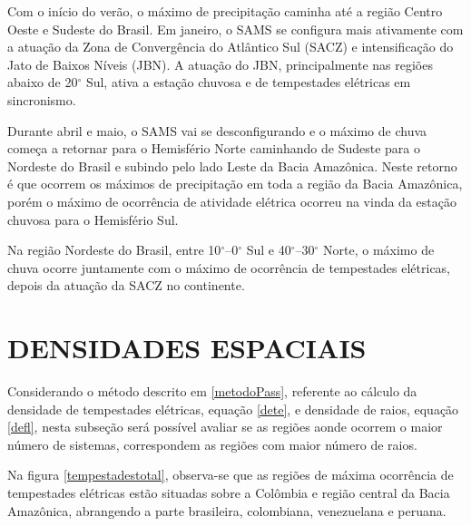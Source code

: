 Com o início do verão, o máximo de precipitação caminha até a região Centro Oeste e Sudeste do Brasil. Em janeiro, o SAMS se configura mais ativamente com a atuação da Zona de Convergência do Atlântico Sul (SACZ)  e intensificação do Jato de Baixos Níveis (JBN).  A atuação do JBN, principalmente nas regiões abaixo de 20$^{\circ}$ Sul, ativa a estação chuvosa e de tempestades elétricas em sincronismo. 

Durante abril e maio, o SAMS vai se desconfigurando e o máximo de chuva começa a retornar para o Hemisfério Norte caminhando de Sudeste para o Nordeste do Brasil e subindo pelo lado Leste da Bacia Amazônica. Neste retorno é que ocorrem os máximos de precipitação em toda a região da Bacia Amazônica, porém o máximo de ocorrência de atividade elétrica ocorreu na vinda da estação chuvosa para o Hemisfério Sul.

Na região Nordeste do Brasil, entre 10$^{\circ}$--0$^{\circ}$ Sul e 40$^{\circ}$--30$^{\circ}$ Norte, o máximo de chuva ocorre juntamente com o máximo de ocorrência de tempestades elétricas, depois da atuação da SACZ no continente.











\section{DENSIDADES ESPACIAIS}


Considerando o método descrito em \ref{metodoPass}, referente ao cálculo da densidade de tempestades elétricas, equação \ref{dete}, e densidade de raios, equação \ref{defl}, nesta subseção será possível avaliar se as regiões aonde ocorrem o maior número de sistemas, correspondem as regiões com maior número de raios.

Na figura \ref{tempestadestotal}, observa-se que as regiões de máxima ocorrência de tempestades elétricas estão situadas sobre a Colômbia e região central da Bacia Amazônica, abrangendo a parte brasileira, colombiana, venezuelana e peruana.



